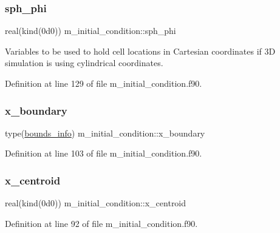 \subsubsection{\texorpdfstring{sph\+\_\+phi}{sph\_phi}}
{\footnotesize\ttfamily real(kind(0d0)) m\+\_\+initial\+\_\+condition\+::sph\+\_\+phi}



Variables to be used to hold cell locations in Cartesian coordinates if 3D simulation is using cylindrical coordinates. 



Definition at line 129 of file m\+\_\+initial\+\_\+condition.\+f90.

\mbox{\label{namespacem__initial__condition_abcd86e737c47247631a1fb95c1764b00}} 
\subsubsection{\texorpdfstring{x\+\_\+boundary}{x\_boundary}}
{\footnotesize\ttfamily type(\hyperlink{structm__derived__types_1_1bounds__info}{bounds\+\_\+info}) m\+\_\+initial\+\_\+condition\+::x\+\_\+boundary}



Definition at line 103 of file m\+\_\+initial\+\_\+condition.\+f90.

\mbox{\label{namespacem__initial__condition_aaf66843a6e051174a3cde0729daa1300}} 
\subsubsection{\texorpdfstring{x\+\_\+centroid}{x\_centroid}}
{\footnotesize\ttfamily real(kind(0d0)) m\+\_\+initial\+\_\+condition\+::x\+\_\+centroid}



Definition at line 92 of file m\+\_\+initial\+\_\+condition.\+f90.

\mbox{\label{namespacem__initial__condition_ab669c9fbfa80cdc9139ea45f293b7f49}} 
